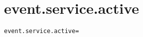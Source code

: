 \section{event.service.active}
\label{configuration:EventServiceActive}
\ClearAPI
\TODO
\begin{lstlisting}[style=Props,caption={Usage example for \textit{event.service.active}}]
event.service.active=
\end{lstlisting}